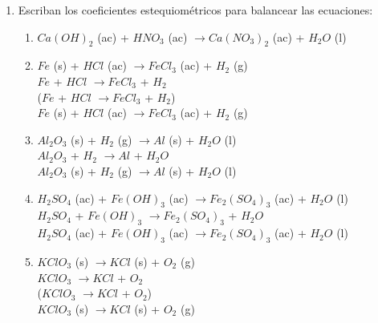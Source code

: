 \documentclass[../Práctica.root.tex]{subfiles}
\newcommand{\lra}{\ensuremath{\longrightarrow{}}}
\begin{document}
\begin{enumerate}
    \item Escriban los coeficientes estequiométricos para balancear las ecuaciones:
          \begin{enumerate}
              \item $Ca(OH)_2$ (ac) + $HNO_3$ (ac) \lra $Ca(NO_3)_2$ (ac) + $H_2O$ (l)
              \item $Fe$ (s) + $HCl$ (ac) \lra $FeCl_3$ (ac) + $H_2$ (g) \\
                    $Fe$ + $HCl$ \lra $FeCl_3$ + $H_2$ \\
                    ($Fe$ + $HCl$ \lra $FeCl_3$ + $H_2$)\cdot{} \\
                    $Fe$ (s) + $HCl$ (ac) \lra {}$FeCl_3$ (ac) + $H_2$ (g)
              \item $Al_2O_3$ (s) + $H_2$ (g) \lra $Al$ (s) + $H_2O$ (l) \\
                    $Al_2O_3$ + $H_2$ \lra {}$Al$ + $H_2O$ \\
                    $Al_2O_3$ (s) + $H_2$ (g) \lra {}$Al$ (s) + $H_2O$ (l)
              \item $H_2SO_4$ (ac) + $Fe(OH)_3$ (ac) \lra $Fe_2(SO_4)_3$ (ac) + $H_2O$ (l) \\
                    $H_2SO_4$ + $Fe(OH)_3$ \lra $Fe_2(SO_4)_3$ + $H_2O$ \\
                    $H_2SO_4$ (ac) + $Fe(OH)_3$ (ac) \lra $Fe_2(SO_4)_3$ (ac) + $H_2O$ (l)
              \item $KClO_3$ (s) \lra $KCl$ (s) + $O_2$ (g) \\
                    $KClO_3$ \lra $KCl$ + $O_2$ \\
                    ($KClO_3$ \lra $KCl$ + $O_2$)\cdot{} \\
                    $KClO_3$ (s) \lra {}$KCl$ (s) + $O_2$ (g)
          \end{enumerate}


\end{enumerate}
\end{document}
